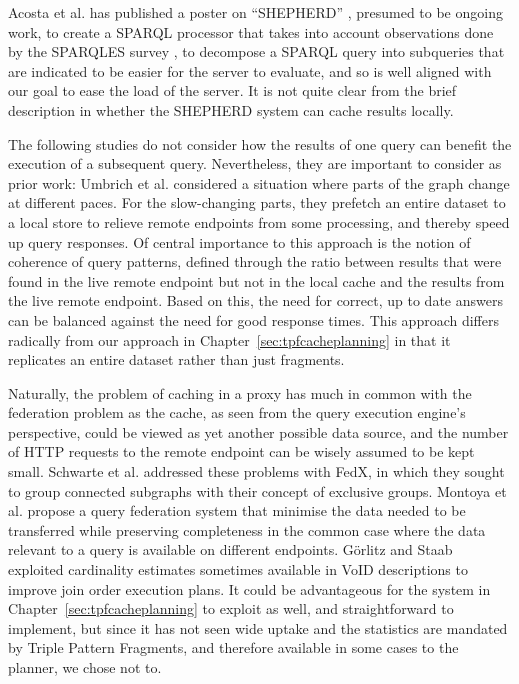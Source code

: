Acosta et al. has published a poster on ``SHEPHERD''
\cite{acosta2014shepherd}, presumed to be ongoing work, to
create a SPARQL processor that takes into account observations done by
the SPARQLES survey \cite{buil2013sparql}, to decompose a SPARQL query into
subqueries that are indicated to be easier for the server to evaluate,
and so is well aligned with our goal to ease the load of the
server. It is not quite clear from the brief description in 
\cite{acosta2014shepherd} whether the SHEPHERD system can cache results locally.

The following studies do not consider how the results of one query can
benefit the execution of a subsequent query. Nevertheless, they are
important to consider as prior work:
Umbrich et al. \cite{umbrich2012hybrid} considered a situation where
parts of the graph change at different paces. For the slow-changing
parts, they prefetch an entire dataset to a local store to relieve
remote endpoints from some processing, and thereby speed up query
responses. Of central importance to this approach is the notion of
coherence of query patterns, defined through the ratio between results
that were found in the live remote endpoint but not in the local cache
and the results from the live remote endpoint. Based on this, the need
for correct, up to date answers can be balanced against the need for
good response times.  This approach differs radically from our
approach in Chapter~\ref{sec:tpfcacheplanning} in that it replicates
an entire dataset rather than just fragments.

Naturally, the problem of caching in a proxy has much in common with
the federation problem as the cache, as seen from the query execution
engine's perspective, could be viewed as yet another possible data
source, and the number of HTTP requests to the remote endpoint can be
wisely assumed to be kept small. Schwarte et
al. \cite{springerlink:10.1007/978-3-642-25073-6-38} addressed these
problems with FedX, in which they sought to group connected subgraphs
with their concept of exclusive groups.  Montoya et
al. \cite{montoya2015federated} propose a query federation system that
minimise the data needed to be transferred while preserving
completeness in the common case where the data relevant to a query is
available on different endpoints. Görlitz and Staab \cite{splendid}
exploited cardinality estimates sometimes available in VoID
\cite{voidnote} descriptions to improve join order execution plans. It
could be advantageous for the system in
Chapter~\ref{sec:tpfcacheplanning} to exploit as well, and
straightforward to implement, but since it has not seen wide uptake
and the statistics are mandated by Triple Pattern Fragments, and
therefore available in some cases to the planner, we chose not to.

